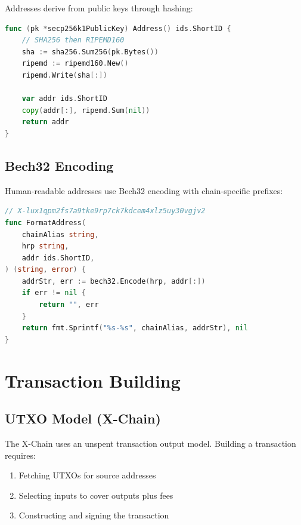 \documentclass[11pt,twocolumn]{article}
\begin{document}
Addresses derive from public keys through hashing:

\begin{lstlisting}[language=Go,caption=Address Derivation]
func (pk *secp256k1PublicKey) Address() ids.ShortID {
    // SHA256 then RIPEMD160
    sha := sha256.Sum256(pk.Bytes())
    ripemd := ripemd160.New()
    ripemd.Write(sha[:])

    var addr ids.ShortID
    copy(addr[:], ripemd.Sum(nil))
    return addr
}
\end{lstlisting}

\subsection{Bech32 Encoding}

Human-readable addresses use Bech32 encoding with chain-specific prefixes:

\begin{lstlisting}[language=Go,caption=Bech32 Addresses]
// X-lux1qpm2fs7a9tke9rp7ck7kdcem4xlz5uy30vgjv2
func FormatAddress(
    chainAlias string,
    hrp string,
    addr ids.ShortID,
) (string, error) {
    addrStr, err := bech32.Encode(hrp, addr[:])
    if err != nil {
        return "", err
    }
    return fmt.Sprintf("%s-%s", chainAlias, addrStr), nil
}
\end{lstlisting}

\section{Transaction Building}

\subsection{UTXO Model (X-Chain)}

The X-Chain uses an unspent transaction output model. Building a transaction requires:

\begin{enumerate}
    \item Fetching UTXOs for source addresses
    \item Selecting inputs to cover outputs plus fees
    \item Constructing and signing the transaction
\end{enumerate}
\end{document}
